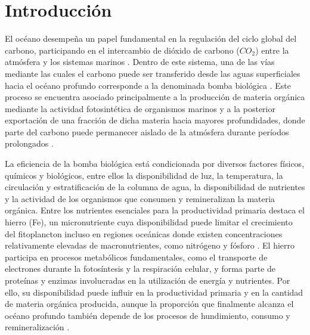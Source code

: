 \chapter{Introducción}

El océano desempeña un papel fundamental en la regulación del ciclo global del carbono, participando en el intercambio de dióxido de carbono ($CO_2$) entre la atmósfera y los sistemas marinos \citep{HainSigman2014}. Dentro de este sistema, una de las vías mediante las cuales el carbono puede ser transferido desde las aguas superficiales hacia el océano profundo corresponde a la denominada bomba biológica \citep{HainSigman2014}. Este proceso se encuentra asociado principalmente a la producción de materia orgánica mediante la actividad fotosintética de organismos marinos y a la posterior exportación de una fracción de dicha materia hacia mayores profundidades, donde parte del carbono puede permanecer aislado de la atmósfera durante períodos prolongados \citep{HainSigman2014}.

La eficiencia de la bomba biológica está condicionada por diversos factores físicos, químicos y biológicos, entre ellos la disponibilidad de luz, la temperatura, la circulación y estratificación de la columna de agua, la disponibilidad de nutrientes y la actividad de los organismos que consumen y remineralizan la materia orgánica. Entre los nutrientes esenciales para la productividad primaria destaca el hierro (Fe), un micronutriente cuya disponibilidad puede limitar el crecimiento del fitoplancton incluso en regiones oceánicas donde existen concentraciones relativamente elevadas de macronutrientes, como nitrógeno y fósforo \citep{Tagliabue2017}. El hierro participa en procesos metabólicos fundamentales, como el transporte de electrones durante la fotosíntesis y la respiración celular, y forma parte de proteínas y enzimas involucradas en la utilización de energía y nutrientes. Por ello, su disponibilidad puede influir en la productividad primaria y en la cantidad de materia orgánica producida, aunque la proporción que finalmente alcanza el océano profundo también depende de los procesos de hundimiento, consumo y remineralización \citep{Tagliabue2017}.

